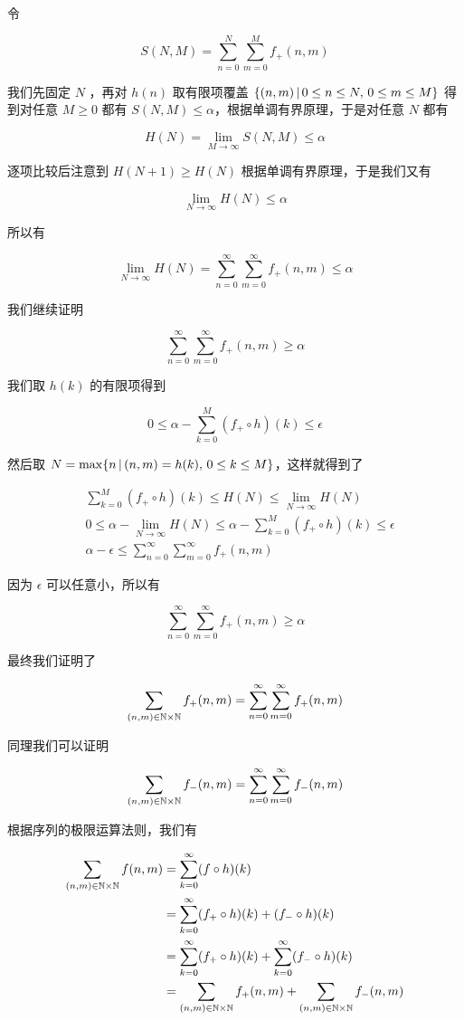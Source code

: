 令

\[
S(N,M) = \sum_{n=0}^{N}\sum_{m=0}^{M}f_+(n,m)
\]

我们先固定 $N$ ，再对 $h(n)$ 取有限项覆盖 $\{ (n,m) \,\vert\, 0 \le n \le N,\, 0 \le m \le M\}$ 得到对任意 $M \ge 0$ 都有 $S(N,M) \le \alpha$，根据单调有界原理，于是对任意 $N$ 都有

\[
H(N) = \lim_{M \to \infty}S(N,M) \le \alpha
\]

逐项比较后注意到 $H(N+1) \ge H(N)$ 根据单调有界原理，于是我们又有

\[
\lim_{N \to \infty}H(N) \le \alpha
\]

所以有

\[
\lim_{N \to \infty}H(N) = \sum_{n=0}^{\infty}\sum_{m=0}^{\infty}f_+(n,m) \le \alpha
\]

我们继续证明 

\[
\sum_{n=0}^{\infty}\sum_{m=0}^{\infty}f_+(n,m) \ge \alpha
\]

我们取 $h(k)$ 的有限项得到

\[
0\le \alpha - \sum_{k=0}^{M} (f_+ \circ h) (k) \le \epsilon
\]

然后取 $N = \max \{ n \,\vert\, (n,m) = h(k),\, 0 \le k \le M\}$，这样就得到了 

\begin{align*}
    & \sum_{k=0}^{M} (f_+ \circ h) (k)  \le H(N) \le \lim_{N \to \infty}H(N) \\
    & 0  \le \alpha - \lim_{N \to \infty}H(N) \le \alpha - \sum_{k=0}^{M} (f_+ \circ h) (k) \le \epsilon \\
    & \alpha -\epsilon \le \sum_{n=0}^{\infty}\sum_{m=0}^{\infty}f_+(n,m)
\end{align*}

因为 $\epsilon$ 可以任意小，所以有

\[
\sum_{n=0}^{\infty}\sum_{m=0}^{\infty}f_+(n,m) \ge \alpha
\]

最终我们证明了


\[
\sum_{(n,m) \in \mathbb{N} \times \mathbb{N}}f_+(n,m) = \sum_{n=0}^{\infty}\sum_{m=0}^{\infty}f_+(n,m) 
\]

同理我们可以证明


\[
\sum_{(n,m) \in \mathbb{N} \times \mathbb{N}}f_-(n,m) = \sum_{n=0}^{\infty}\sum_{m=0}^{\infty}f_-(n,m) 
\]

根据序列的极限运算法则，我们有

\begin{align*}
\sum_{(n,m) \in \mathbb{N} \times \mathbb{N}}f(n,m) &= \sum_{k=0}^{\infty} (f \circ h) (k) \\
&= \sum_{k=0}^{\infty} (f_+ \circ h) (k) + (f_- \circ h) (k) \\
&= \sum_{k=0}^{\infty} (f_+ \circ h) (k) + \sum_{k=0}^{\infty} (f_- \circ h) (k) \\
&= \sum_{(n,m) \in \mathbb{N} \times \mathbb{N}}f_+(n,m) + \sum_{(n,m) \in \mathbb{N} \times \mathbb{N}}f_-(n,m)
\end{align*}

